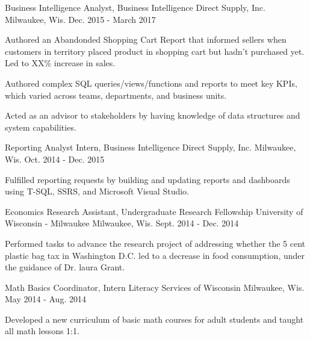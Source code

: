 \begin{cventries}
  \cventry
    {Business Intelligence Analyst, Business Intelligence} %
    {Direct Supply, Inc.} %
    {Milwaukee, Wis.} %
    {Dec. 2015 - March 2017} %
    {
      \begin{cvitems} %
        \item {Authored an Abandonded Shopping Cart Report that informed sellers when customers in territory placed product in shopping cart but hadn't purchased yet. Led to XX\% increase in sales.}
        \item {Authored complex SQL queries/views/functions and reports to meet key KPIs, which varied across teams, departments, and business units.}
        \item {Acted as an advisor to stakeholders by having knowledge of data structures and system capabilities.}
      \end{cvitems}
    }

  \cventry
    {Reporting Analyst Intern, Business Intelligence} %
    {Direct Supply, Inc.} %
    {Milwaukee, Wis.} %
    {Oct. 2014 - Dec. 2015} %
    {
      \begin{cvitems} %
        \item {Fulfilled reporting requests by building and updating reports and dashboards using T-SQL, SSRS, and Microsoft Visual Studio.}
      \end{cvitems}
    }

  \cventry
    {Economics Research Assistant, Undergraduate Research Fellowship} %
    {University of Wisconsin - Milwaukee} %
    {Milwaukee, Wis.} %
    {Sept. 2014 - Dec. 2014} %
    {
      \begin{cvitems} %
        \item {Performed tasks to advance the research project of addressing whether the 5 cent plastic bag tax in Washington D.C. led to a decrease in food consumption, under the guidance of Dr. laura Grant.}
      \end{cvitems}
    }

  \cventry
    {Math Basics Coordinator, Intern} %
    {Literacy Services of Wisconsin} %
    {Milwaukee, Wis.} %
    {May 2014 - Aug. 2014} %
    {
      \begin{cvitems} %
        \item {Developed a new curriculum of basic math courses for adult students and taught all math lessons 1:1.}
      \end{cvitems}
    }
\end{cventries}